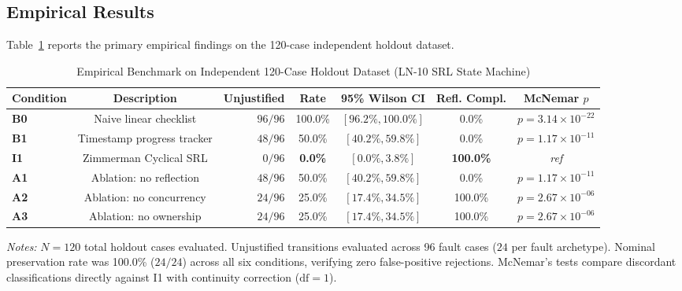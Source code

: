 \documentclass[11pt,a4paper]{article}
\begin{document}
\subsection{Empirical Results}
Table~\ref{tab:holdout-results} reports the primary empirical findings on the 120-case independent holdout dataset.

\begin{table}[htbp]
\centering
\small
\caption{Empirical Benchmark on Independent 120-Case Holdout Dataset (LN-10 SRL State Machine)}
\label{tab:holdout-results}
\begin{tabular}{lcrcccc}
\toprule
\textbf{Condition} & \textbf{Description} & \textbf{Unjustified} & \textbf{Rate} & \textbf{95\% Wilson CI} & \textbf{Refl. Compl.} & \textbf{McNemar $p$} \\
\midrule
\textbf{B0} & Naive linear checklist & $96 / 96$ & 100.0\% & $[96.2\%, 100.0\%]$ & 0.0\% & $p = 3.14 \times 10^{-22}$ \\
\textbf{B1} & Timestamp progress tracker & $48 / 96$ & 50.0\% & $[40.2\%, 59.8\%]$ & 0.0\% & $p = 1.17 \times 10^{-11}$ \\
\textbf{I1} & Zimmerman Cyclical SRL & $0 / 96$ & \textbf{0.0\%} & $[\mathbf{0.0\%}, \mathbf{3.8\%}]$ & \textbf{100.0\%} & \textit{ref} \\
\textbf{A1} & Ablation: no reflection & $48 / 96$ & 50.0\% & $[40.2\%, 59.8\%]$ & 0.0\% & $p = 1.17 \times 10^{-11}$ \\
\textbf{A2} & Ablation: no concurrency & $24 / 96$ & 25.0\% & $[17.4\%, 34.5\%]$ & 100.0\% & $p = 2.67 \times 10^{-06}$ \\
\textbf{A3} & Ablation: no ownership & $24 / 96$ & 25.0\% & $[17.4\%, 34.5\%]$ & 100.0\% & $p = 2.67 \times 10^{-06}$ \\
\bottomrule
\end{tabular}
\par\smallskip
\begin{minipage}{0.98\linewidth}\footnotesize
\textit{Notes:} $N=120$ total holdout cases evaluated. Unjustified transitions evaluated across 96 fault cases ($24$ per fault archetype). Nominal preservation rate was 100.0\% ($24/24$) across all six conditions, verifying zero false-positive rejections. McNemar's tests compare discordant classifications directly against I1 with continuity correction ($\text{df}=1$).
\end{minipage}
\end{table}
\end{document}

